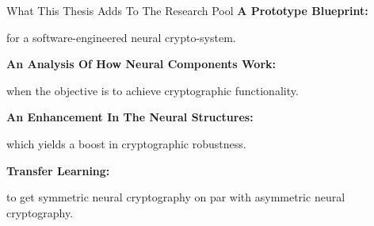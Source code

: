 \documentclass{beamer}
\begin{document}
		\begin{frame}{What This Thesis Adds To The Research Pool}
			\vfill
			\textbf{A Prototype Blueprint:}\\
			{\centering
				for a software-engineered neural crypto-system.
				\par}
			\vfill
			\textbf{An Analysis Of How Neural Components Work:}\\
			{\centering
				when the objective is to achieve cryptographic functionality.
				\par}
			\vfill
			\textbf{An Enhancement In The Neural Structures:}\\
			{\centering
				which yields a boost in cryptographic robustness.
			\par}
			\vfill
			\textbf{Transfer Learning:}\\
			{\centering
				to get symmetric neural cryptography on par with asymmetric neural cryptography.
			\par}
		\end{frame}
\end{document}
